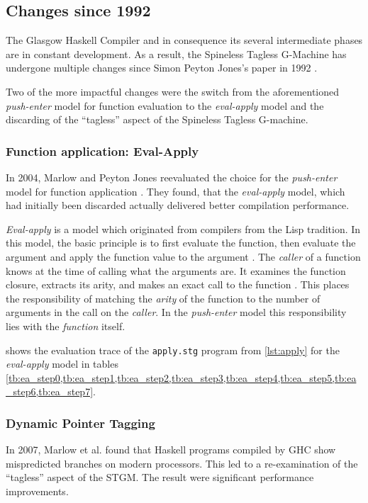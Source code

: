 \documentclass[runningheads]{llncs}
\begin{document}
\subsection{Changes since 1992}
The Glasgow Haskell Compiler and in consequence its several intermediate phases are in constant development. As a result, the Spineless Tagless G-Machine has undergone multiple changes since Simon Peyton Jones's paper in 1992 \cite{jones1992implementing}. 

Two of the more impactful changes were the switch from the aforementioned \textit{push-enter} model for function evaluation to the \textit{eval-apply} model and the discarding of the \enquote{tagless} aspect of the Spineless Tagless G-machine.

\subsubsection{Function application: Eval-Apply}
\label{sec:ea}
In 2004, Marlow and Peyton Jones\cite{marlow2004making} reevaluated the choice for the \textit{push-enter} model for function application . They found, that the \textit{eval-apply} model, which had initially been discarded \cite{jones1992implementing} actually delivered better compilation performance.

\textit{Eval-apply} is a model which originated from compilers from the Lisp tradition. In this model, the basic principle is to first evaluate the function, then evaluate the argument and apply the function value to the argument \cite{jones1992implementing}. The \textit{caller} of a function knows at the time of calling what the arguments are. It examines the function closure, extracts its arity, and makes an exact call to the function \cite{marlow2004making}. This places the responsibility of matching the \textit{arity} of the function to the number of arguments in the call on the \textit{caller}. In the \textit{push-enter} model this responsibility lies with the \textit{function} itself.

 shows the evaluation trace of the \texttt{apply.stg} program  from \cref{lst:apply} for the \textit{eval-apply} model in tables \cref{tb:ea_step0,tb:ea_step1,tb:ea_step2,tb:ea_step3,tb:ea_step4,tb:ea_step5,tb:ea_step6,tb:ea_step7}.


\subsubsection{Dynamic Pointer Tagging}
In 2007, Marlow et al. \cite{marlow2007faster} found that Haskell programs compiled by GHC show mispredicted branches on modern processors. This led to a re-examination of the \enquote{tagless} aspect of the STGM. The result were significant performance improvements.
\end{document}
